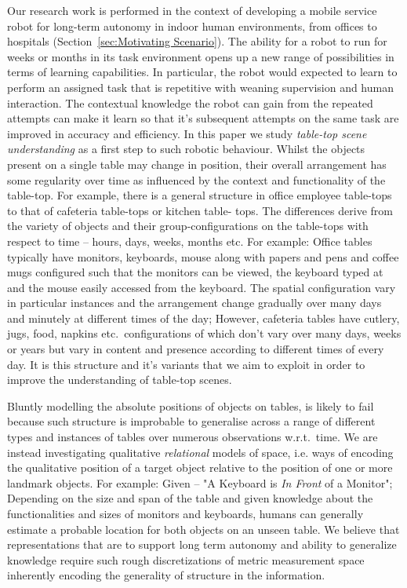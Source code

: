 \documentclass[letterpaper, 10 pt, conference]{ieeeconf}  %
\begin{document}
Our research work is performed in the context of developing a mobile service robot for long-term autonomy in indoor human environments, from 
offices to hospitals (Section~\ref{sec:Motivating Scenario}). 
The ability for a robot to run for weeks or months in its task environment opens up a new range of possibilities in terms of learning 
capabilities. In particular, the robot would expected to learn to perform an assigned task that is repetitive with weaning supervision and 
human interaction. The contextual knowledge the robot can gain from the repeated attempts can make it learn so that it's subsequent attempts 
on the same task are improved in accuracy and efficiency. 
In this paper we study \emph{table-top scene understanding} as a first step to such robotic behaviour. Whilst the objects present on a 
single table may change in position, their overall arrangement has some regularity over time as influenced by the context and functionality 
of the table-top. For example, there is a general structure in office employee table-tops to that of cafeteria table-tops or kitchen table-
tops. The differences derive from the variety of objects and their group-configurations on the table-tops with respect to time -- hours, 
days, weeks, months etc. For example: Office tables typically have monitors, keyboards, mouse along with papers and pens and coffee mugs 
configured such that the monitors can be viewed, the keyboard typed at and the mouse easily accessed from the keyboard. The spatial 
configuration vary in particular instances and the arrangement change gradually over many days and minutely at different times of the day; 
However, cafeteria tables have cutlery, jugs, food, napkins etc.\ configurations of which don't vary over many days, weeks or years but vary 
in content and presence according to different times of every day. It is this structure and it's variants that we aim to exploit in order to 
improve the understanding of table-top scenes.

Bluntly modelling the absolute positions of objects on tables, is likely to fail because such structure is improbable to 
generalise across a range of different types and instances of tables over numerous observations w.r.t.\ time. We are instead 
investigating qualitative \emph{relational} models of space, i.e. ways of encoding the qualitative position of a target object relative to 
the position of one or more landmark objects. For example: Given -- "A Keyboard is \textit{In Front} of a Monitor"; Depending on the size 
and span of the table and given knowledge about the functionalities and sizes of monitors and keyboards, humans can generally estimate a 
probable location for both objects on an unseen table. We believe that representations that are to support long term autonomy and ability to 
generalize knowledge require such rough discretizations of metric measurement space inherently encoding the generality of structure in the 
information. 
\end{document}
